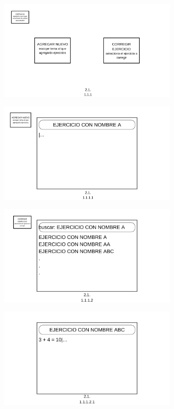 \documentclass{report}
\begin{document}
\begin{figure}[H]
    \centering
    \includegraphics[width=0.8\textwidth]{./Diagramas/10.png}
\end{figure}

\begin{figure}[H]
    \centering
    \includegraphics[width=0.8\textwidth]{./Diagramas/11.png}
\end{figure}

\begin{figure}[H]
    \centering
    \includegraphics[width=0.8\textwidth]{./Diagramas/12.png}
\end{figure}

\begin{figure}[H]
    \centering
    \includegraphics[width=0.8\textwidth]{./Diagramas/13.png}
\end{figure}
\end{document}

